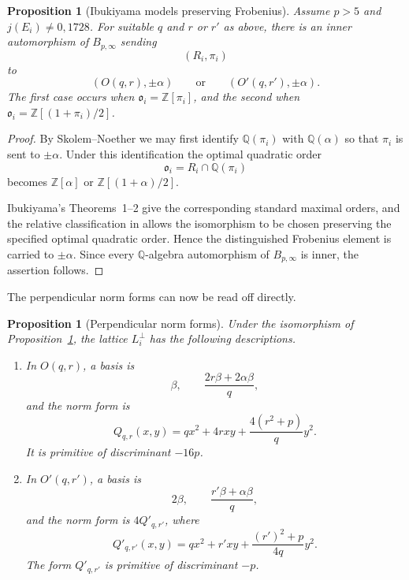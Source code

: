 \documentclass[10pt,a4paper]{amsart}
\newtheorem{proposition}[theorem]{Proposition}
\newcommand{\Q}{\mathbb{Q}}
\newcommand{\Z}{\mathbb{Z}}
\begin{document}
\begin{proposition}[Ibukiyama models preserving Frobenius]
\label{prop:pair-model}
Assume $p>5$ and $j(E_i)\ne0,1728$. For suitable $q$ and $r$ or $r'$
as above, there is an inner automorphism of $B_{p,\infty}$ sending
\[
  (R_i,\pi_i)
\]
to
\[
  (O(q,r),\pm\alpha)
  \qquad\text{or}\qquad
  (O'(q,r'),\pm\alpha).
\]
The first case occurs when $\mathfrak o_i=\Z[\pi_i]$, and the second
when $\mathfrak o_i=\Z[(1+\pi_i)/2]$.
\end{proposition}

\begin{proof}
By Skolem--Noether we may first identify
$\Q(\pi_i)$ with $\Q(\alpha)$ so that $\pi_i$ is sent to
$\pm\alpha$. Under this identification the optimal quadratic order
\[
  \mathfrak o_i=R_i\cap\Q(\pi_i)
\]
becomes $\Z[\alpha]$ or $\Z[(1+\alpha)/2]$.

Ibukiyama's Theorems~1--2 give the corresponding standard maximal
orders, and the relative classification in
\cite[Section~4, Propositions~4.1--4.2]{Ibukiyama1982}
allows the isomorphism to be chosen preserving the specified optimal
quadratic order. Hence the distinguished Frobenius element is carried to
$\pm\alpha$. Since every $\Q$-algebra automorphism of
$B_{p,\infty}$ is inner, the assertion follows.
\end{proof}


The perpendicular norm forms can now be read off directly.

\begin{proposition}[Perpendicular norm forms]\label{prop:perp-forms}
Under the isomorphism of Proposition~\ref{prop:pair-model}, the lattice $L_i^\perp$ has the following descriptions.
\begin{enumerate}[label=\textup{(\alph*)}]
\item In $O(q,r)$, a basis is
\[
  \beta,\qquad \frac{2r\beta+2\alpha\beta}{q},
\]
and the norm form is
\[
  Q_{q,r}(x,y)=qx^2+4rxy+\frac{4(r^2+p)}q y^2.
\]
It is primitive of discriminant $-16p$.
\item In $O'(q,r')$, a basis is
\[
  2\beta,\qquad\frac{r'\beta+\alpha\beta}{q},
\]
and the norm form is $4Q'_{q,r'}$, where
\[
  Q'_{q,r'}(x,y)=qx^2+r'xy+\frac{(r')^2+p}{4q}y^2.
\]
The form $Q'_{q,r'}$ is primitive of discriminant $-p$.
\end{enumerate}
\end{proposition}
\end{document}
